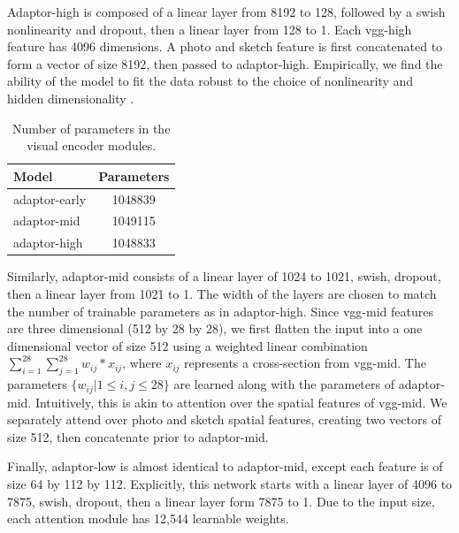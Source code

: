 \documentclass[9pt,twocolumn,twoside]{pnas-new}
\newcommand{\mwu}[1]{{\color{green}{[mwu: #1]}}}
\begin{document}
{Adaptor-high is composed of a linear layer from 8192 to 128, followed by a swish nonlinearity \cite[]{ramachandran2018searching} and dropout, then a linear layer from 128 to 1. Each vgg-high feature has 4096 dimensions. A photo and sketch feature is first concatenated to form a vector of size 8192, then passed to adaptor-high. Empirically, we find the ability of the model to fit the data robust to the choice of nonlinearity and hidden dimensionality \mwu{@judy, here is a good place to show that figure saying hidden layer size isn't terribly important}.

\begin{table}
\centering
\begin{tabular}{| l | c |}
\hline
Model & Parameters \\
\hline
\hline
adaptor-early & 1048839 \\
\hline
adaptor-mid & 1049115 \\
\hline
adaptor-high & 1048833 \\
\hline
\end{tabular}
\caption{Number of parameters in the visual encoder modules.}
\label{table:parameters}
\end{table}

Similarly, adaptor-mid consists of a linear layer of 1024 to 1021, swish, dropout, then a linear layer from 1021 to 1. The width of the layers are chosen to match the number of trainable parameters as in adaptor-high. Since vgg-mid features are three dimensional (512 by 28 by 28), we first flatten the input into a one dimensional vector of size 512 using a weighted linear combination $\sum_{i=1}^{28}\sum_{j=1}^{28} w_{ij} * x_{ij}$, where $x_{ij}$ represents a cross-section from vgg-mid. The parameters $\{w_{ij}|1\leq i,j \leq 28\}$ are learned along with the parameters of adaptor-mid. Intuitively, this is akin to attention over the spatial features of vgg-mid. We separately attend over photo and sketch spatial features, creating two vectors of size 512, then concatenate prior to adaptor-mid.

Finally, adaptor-low is almost identical to adaptor-mid, except each feature is of size 64 by 112 by 112. Explicitly, this network starts with a linear layer of 4096 to 7875, swish, dropout, then a linear layer form 7875 to 1. Due to the input size, each attention module has 12,544 learnable weights.

}
\end{document}
